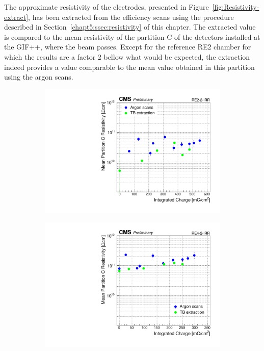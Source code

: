 	The approximate resistivity of the electrodes, presented in Figure~\ref{fig:Resistivity-extract}, has been extracted from the efficiency scans using the procedure described in Section~\ref{chapt5:ssec:resistivity} of this chapter. The extracted value is compared to the mean resistivity of the partition C of the detectors installed at the GIF++, where the beam passes. Except for the reference RE2 chamber for which the results are a factor 2 bellow what would be expected, the extraction indeed provides a value comparable to the mean value obtained in this partition using the argon scans.
	
	\begin{figure}[H]
    	\begin{subfigure}{0.5\linewidth}
			\centering
    		\includegraphics[width = \linewidth]{fig/chapt5/Extract-Res_vs_time_RE2-2-IRR.pdf}
        	\caption{\label{fig:Resistivity-extract:A}}
    	\end{subfigure}
    	\begin{subfigure}{0.5\linewidth}
			\centering
    		\includegraphics[width = \linewidth]{fig/chapt5/Extract-Res_vs_time_RE4-2-IRR.pdf}

\end{subfigure}
\end{figure}
